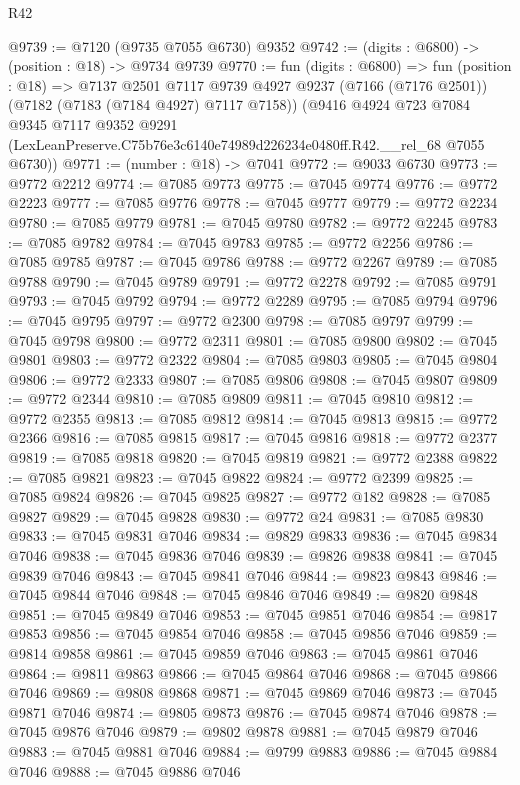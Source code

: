 \begin{lexlean}{R42}
\begin{coremodule}
{@9739 := @7120 (@9735 @7055 @6730) @9352
@9742 := (digits : @6800) -> (position : @18) -> @9734 @9739
@9770 := fun (digits : @6800) =>
  fun (position : @18) =>
  @7137
    @2501
    @7117
    @9739
    @4927
    @9237
    (@7166 (@7176 @2501))
    (@7182 (@7183 (@7184 @4927) @7117 @7158))
    (@9416
      @4924
      @723
      @7084
      @9345
      @7117
      @9352
      @9291
      (LexLeanPreserve.C75b76e3c6140e74989d226234e0480ff.R42.__rel_68 @7055 @6730))
@9771 := (number : @18) -> @7041
@9772 := @9033 @6730
@9773 := @9772 @2212
@9774 := @7085 @9773
@9775 := @7045 @9774
@9776 := @9772 @2223
@9777 := @7085 @9776
@9778 := @7045 @9777
@9779 := @9772 @2234
@9780 := @7085 @9779
@9781 := @7045 @9780
@9782 := @9772 @2245
@9783 := @7085 @9782
@9784 := @7045 @9783
@9785 := @9772 @2256
@9786 := @7085 @9785
@9787 := @7045 @9786
@9788 := @9772 @2267
@9789 := @7085 @9788
@9790 := @7045 @9789
@9791 := @9772 @2278
@9792 := @7085 @9791
@9793 := @7045 @9792
@9794 := @9772 @2289
@9795 := @7085 @9794
@9796 := @7045 @9795
@9797 := @9772 @2300
@9798 := @7085 @9797
@9799 := @7045 @9798
@9800 := @9772 @2311
@9801 := @7085 @9800
@9802 := @7045 @9801
@9803 := @9772 @2322
@9804 := @7085 @9803
@9805 := @7045 @9804
@9806 := @9772 @2333
@9807 := @7085 @9806
@9808 := @7045 @9807
@9809 := @9772 @2344
@9810 := @7085 @9809
@9811 := @7045 @9810
@9812 := @9772 @2355
@9813 := @7085 @9812
@9814 := @7045 @9813
@9815 := @9772 @2366
@9816 := @7085 @9815
@9817 := @7045 @9816
@9818 := @9772 @2377
@9819 := @7085 @9818
@9820 := @7045 @9819
@9821 := @9772 @2388
@9822 := @7085 @9821
@9823 := @7045 @9822
@9824 := @9772 @2399
@9825 := @7085 @9824
@9826 := @7045 @9825
@9827 := @9772 @182
@9828 := @7085 @9827
@9829 := @7045 @9828
@9830 := @9772 @24
@9831 := @7085 @9830
@9833 := @7045 @9831 @7046
@9834 := @9829 @9833
@9836 := @7045 @9834 @7046
@9838 := @7045 @9836 @7046
@9839 := @9826 @9838
@9841 := @7045 @9839 @7046
@9843 := @7045 @9841 @7046
@9844 := @9823 @9843
@9846 := @7045 @9844 @7046
@9848 := @7045 @9846 @7046
@9849 := @9820 @9848
@9851 := @7045 @9849 @7046
@9853 := @7045 @9851 @7046
@9854 := @9817 @9853
@9856 := @7045 @9854 @7046
@9858 := @7045 @9856 @7046
@9859 := @9814 @9858
@9861 := @7045 @9859 @7046
@9863 := @7045 @9861 @7046
@9864 := @9811 @9863
@9866 := @7045 @9864 @7046
@9868 := @7045 @9866 @7046
@9869 := @9808 @9868
@9871 := @7045 @9869 @7046
@9873 := @7045 @9871 @7046
@9874 := @9805 @9873
@9876 := @7045 @9874 @7046
@9878 := @7045 @9876 @7046
@9879 := @9802 @9878
@9881 := @7045 @9879 @7046
@9883 := @7045 @9881 @7046
@9884 := @9799 @9883
@9886 := @7045 @9884 @7046
@9888 := @7045 @9886 @7046
}
\end{coremodule}
\end{lexlean}
